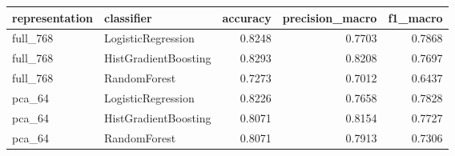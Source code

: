 \begin{tabular}{llrrr}
\toprule
representation & classifier & accuracy & precision\_macro & f1\_macro \\
\midrule
full\_768 & LogisticRegression & 0.8248 & 0.7703 & 0.7868 \\
full\_768 & HistGradientBoosting & 0.8293 & 0.8208 & 0.7697 \\
full\_768 & RandomForest & 0.7273 & 0.7012 & 0.6437 \\
pca\_64 & LogisticRegression & 0.8226 & 0.7658 & 0.7828 \\
pca\_64 & HistGradientBoosting & 0.8071 & 0.8154 & 0.7727 \\
pca\_64 & RandomForest & 0.8071 & 0.7913 & 0.7306 \\
\bottomrule
\end{tabular}
